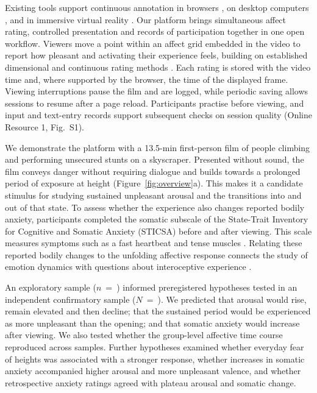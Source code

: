 \documentclass[man,12pt,british]{apa7}
\begin{document}
Existing tools support continuous annotation in browsers
\parencite{boccignone2017amhuse,farrens2020continuous,louven2022emotouch,melhart2019pagan}, on desktop computers
\parencite{girard2014carma,girard2018darma}, and in immersive virtual reality \parencite{fourcade2025affecttracker}.
Our platform brings simultaneous affect rating, controlled presentation and records of participation together in one
open workflow. Viewers move a point within an affect grid embedded in the video to report how pleasant and activating
their experience feels, building on established dimensional and continuous rating methods
\parencite{russell1980circumplex,russell1989affectgrid,schubert1999measuring}. Each rating is stored with the video
time and, where supported by the browser, the time of the displayed frame. Viewing interruptions pause the film and are
logged, while periodic saving allows sessions to resume after a page reload. Participants practise before viewing, and
input and text-entry records support subsequent checks on session quality (Online Resource 1, Fig.~S1).

We demonstrate the platform with a 13.5-min first-person film of people climbing and performing unsecured stunts on a
skyscraper. Presented without sound, the film conveys danger without requiring dialogue and builds towards a prolonged
period of exposure at height (Figure~\ref{fig:overview}a). This makes it a candidate stimulus for studying sustained
unpleasant arousal and the transitions into and out of that state. To assess whether the experience also changes
reported bodily anxiety, participants completed the somatic subscale of the State-Trait Inventory for Cognitive and
Somatic Anxiety (STICSA) before and after viewing. This scale measures symptoms such as a fast heartbeat and tense
muscles \parencite{gros2007psychometric,ree2008distinguishing}. Relating these reported bodily changes to the
unfolding affective response connects the study of emotion dynamics with questions about interoceptive experience
\parencite{cristaldi2026beyond,critchley2017interoception}.

An exploratory sample ($n$~=~) informed preregistered hypotheses tested in an independent
confirmatory sample ($N$~=~). We predicted that arousal would rise, remain elevated and then decline;
that the sustained period would be experienced as more unpleasant than the opening; and that somatic anxiety would
increase after viewing. We also tested whether the group-level affective time course reproduced across samples.
Further hypotheses examined whether everyday fear of heights was associated with a stronger response, whether
increases in somatic anxiety accompanied higher arousal and more unpleasant valence, and whether retrospective
anxiety ratings agreed with plateau arousal and somatic change.
\end{document}

